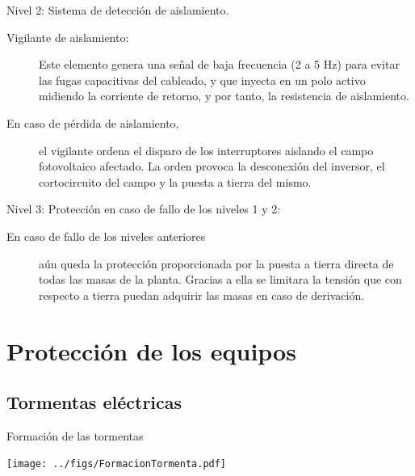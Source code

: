 \documentclass[aspectratio=169, usenames,svgnames,dvipsnames]{beamer}
\begin{document}
\begin{frame}[label={sec:orgabffa10}]{Nivel 2: Sistema de detección de aislamiento.}
\begin{description}
\item[{Vigilante de aislamiento:}] Este elemento genera una señal de baja
frecuencia (2 a 5 Hz) para evitar las fugas capacitivas del cableado,
y que inyecta en un polo activo midiendo la corriente de retorno, y
por tanto, la resistencia de aislamiento.

\item[{En caso de pérdida de aislamiento,}] el vigilante ordena el disparo
de los interruptores aislando el campo fotovoltaico afectado. La
orden provoca la desconexión del inversor, el cortocircuito del campo
y la puesta a tierra del mismo.
\end{description}
\end{frame}

\begin{frame}[label={sec:orgab878e4}]{Nivel 3: Protección en caso de fallo de los niveles 1 y 2:}
\begin{description}
\item[{En caso de fallo de los niveles anteriores}] aún queda la protección
proporcionada por la puesta a tierra directa de todas las masas de la
planta. Gracias a ella se limitara la tensión que con respecto a
tierra puedan adquirir las masas en caso de derivación.
\end{description}
\end{frame}



\section{Protección de los equipos}
\label{sec:org0c10842}

\subsection{Tormentas eléctricas}
\label{sec:orgdfbd14d}

\begin{frame}[label={sec:org3b61dd7}]{Formación de las tormentas}
\begin{center}
\texttt{[image: ../figs/FormacionTormenta.pdf]}
\end{center}
\end{frame}
\end{document}

